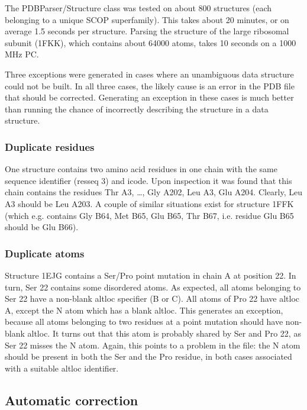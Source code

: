 The PDBParser/Structure class was tested on about 800 structures (each belonging
to a unique SCOP superfamily). This takes about 20 minutes, or on average 1.5
seconds per structure. Parsing the structure of the large ribosomal subunit
(1FKK), which contains about 64000 atoms, takes 10 seconds on a 1000 MHz PC.

Three exceptions were generated in cases where an unambiguous data structure
could not be built. In all three cases, the likely cause is an error in the
PDB file that should be corrected. Generating an exception in these cases
is much better than running the chance of incorrectly describing
the structure in a data structure.

\subsubsection{Duplicate residues}

One structure contains two amino acid residues in one chain with the same sequence
identifier (resseq 3) and icode. Upon inspection it was found that this chain
contains the residues Thr A3, \ldots, Gly A202, Leu A3, Glu A204. Clearly,
Leu A3 should be Leu A203. A couple of similar situations exist for structure
1FFK (which e.g. contains Gly B64, Met B65, Glu B65, Thr B67, i.e. residue Glu
B65 should be Glu B66).

\subsubsection{Duplicate atoms}

Structure 1EJG contains a Ser/Pro point mutation in chain A at position 22.
In turn, Ser 22 contains some disordered atoms. As expected, all atoms belonging
to Ser 22 have a non-blank altloc specifier (B or C). All atoms of Pro 22 have
altloc A, except the N atom which has a blank altloc. This generates an exception,
because all atoms belonging to two residues at a point mutation should have
non-blank altloc. It turns out that this atom is probably shared by Ser and
Pro 22, as Ser 22 misses the N atom. Again, this points to a problem in the
file: the N atom should be present in both the Ser and the Pro residue, in both
cases associated with a suitable altloc identifier.

\subsection{Automatic correction}

